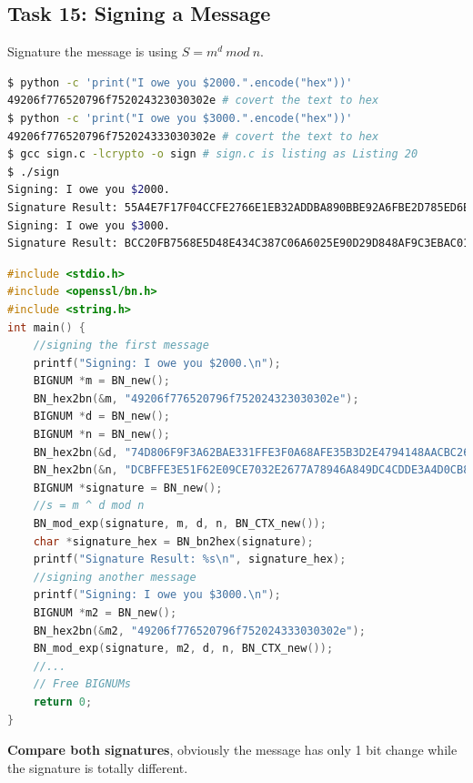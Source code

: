 \documentclass[a4paper]{article}
\begin{document}
\subsection{Task 15: Signing a Message}
Signature the message is using $S = m^d\ mod\ n$.
\begin{lstlisting}[caption={Result of the Task 15},label={lst:task15},language=BASH,breaklines=true]
$ python -c 'print("I owe you $2000.".encode("hex"))'
49206f776520796f752024323030302e # covert the text to hex
$ python -c 'print("I owe you $3000.".encode("hex"))'
49206f776520796f752024333030302e # covert the text to hex
$ gcc sign.c -lcrypto -o sign # sign.c is listing as Listing 20
$ ./sign
Signing: I owe you $2000.
Signature Result: 55A4E7F17F04CCFE2766E1EB32ADDBA890BBE92A6FBE2D785ED6E73CCB35E4CB
Signing: I owe you $3000.
Signature Result: BCC20FB7568E5D48E434C387C06A6025E90D29D848AF9C3EBAC0135D99305822
\end{lstlisting} 
\begin{lstlisting}[caption={C Program Code for Signature},label={lst:task4.15-2},language=C,breaklines=true]
#include <stdio.h>
#include <openssl/bn.h>
#include <string.h>
int main() {
    //signing the first message
    printf("Signing: I owe you $2000.\n");
    BIGNUM *m = BN_new();
    BN_hex2bn(&m, "49206f776520796f752024323030302e");
    BIGNUM *d = BN_new();
    BIGNUM *n = BN_new();
    BN_hex2bn(&d, "74D806F9F3A62BAE331FFE3F0A68AFE35B3D2E4794148AACBC26AA381CD7D30D");
    BN_hex2bn(&n, "DCBFFE3E51F62E09CE7032E2677A78946A849DC4CDDE3A4D0CB81629242FB1A5");
    BIGNUM *signature = BN_new();
    //s = m ^ d mod n
    BN_mod_exp(signature, m, d, n, BN_CTX_new());
    char *signature_hex = BN_bn2hex(signature);
    printf("Signature Result: %s\n", signature_hex);
    //signing another message
    printf("Signing: I owe you $3000.\n");
    BIGNUM *m2 = BN_new();
    BN_hex2bn(&m2, "49206f776520796f752024333030302e");
    BN_mod_exp(signature, m2, d, n, BN_CTX_new());
    //...
    // Free BIGNUMs
    return 0;
}
\end{lstlisting} 
\textbf{Compare both signatures}, obviously the message has only 1 bit change while the signature is totally different.
\end{document}
